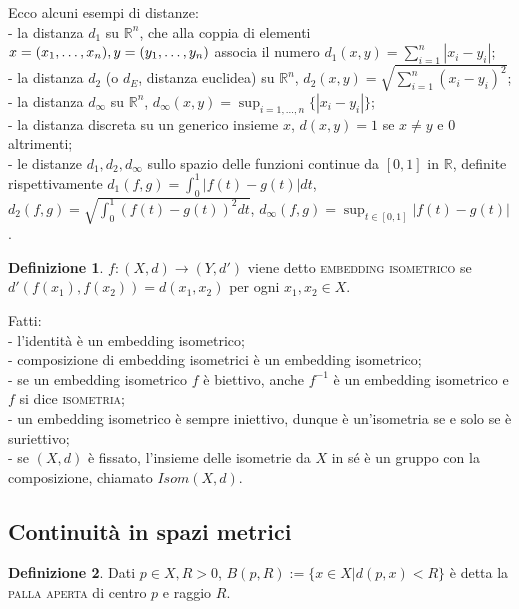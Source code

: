 \documentclass{article}
\theoremstyle{definition}
\newtheorem*{defn}{Definizione}
\begin{document}
	Ecco alcuni esempi di distanze: \\
	- la distanza $d_1$ su $\mathbb{R}^n$, che alla coppia di elementi $x=(x_1, \dots, x_n), \\ y=(y_1, \dots, y_n)$ associa il numero $\displaystyle d_1(x, y)=\sum_{i=1}^n |x_i-y_i|$; \\
	- la distanza $d_2$ (o $d_E$, distanza euclidea) su $\mathbb{R}^n$, $\displaystyle d_2(x, y)=\sqrt{\sum_{i=1}^n (x_i-y_i)^2}$; \\
	- la distanza $d_{\infty}$ su $\mathbb{R}^n$, $\displaystyle d_{\infty}(x, y)=\sup_{i=1, \dots, n} \{ |x_i-y_i| \}$; \\
	- la distanza discreta su un generico insieme $x$, $d(x, y)=1$ se $x \not= y$ e $0$ altrimenti; \\
	- le distanze $d_1, d_2, d_{\infty}$ sullo spazio delle funzioni continue da $[0, 1]$ in $\mathbb{R}$, definite rispettivamente $\displaystyle d_1(f, g)=\int_0^1 |f(t)-g(t)| dt$, $\displaystyle d_2(f, g)=\sqrt{\int_0^1 (f(t)-g(t))^2 dt}$, $\displaystyle d_{\infty}(f, g)=\sup_{t \in [0, 1]} |f(t)-g(t)|$.
	
	\begin{defn}
		$f:(X, d) \rightarrow (Y, d')$ viene detto \textsc{embedding isometrico} se $d'(f(x_1), f(x_2))=d(x_1, x_2)$ per ogni $x_1, x_2 \in X$.
	\end{defn}
	
	Fatti: \\
	- l'identità è un embedding isometrico; \\
	- composizione di embedding isometrici è un embedding isometrico; \\
	- se un embedding isometrico $f$ è biettivo, anche $f^{-1}$ è un embedding isometrico e $f$ si dice \textsc{isometria}; \\
	- un embedding isometrico è sempre iniettivo, dunque è un'isometria se e solo se è suriettivo; \\
	- se $(X, d)$ è fissato, l'insieme delle isometrie da $X$ in sé è un gruppo con la composizione, chiamato $Isom(X,d)$. \\
	
	\subsection{Continuità in spazi metrici}
	
	\begin{defn}
		Dati $p \in X, R>0$, $B(p, R):=\{ x \in X | d(p, x)<R\}$ è detta la \textsc{palla aperta} di centro $p$ e raggio $R$.
	\end{defn}
	
\end{document}
